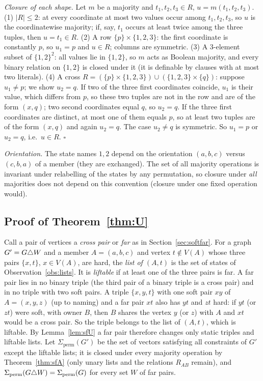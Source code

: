 \emph{Closure of each shape.} Let $m$ be a majority and $t_1,t_2,t_3\in R$, $u=m(t_1,t_2,t_3)$.
(1) $|R|\le2$: at every coordinate at most two values occur among $t_1,t_2,t_3$, so $u$ is the coordinatewise majority; if, say, $t_1$ occurs at least twice among the three tuples, then $u=t_1\in R$.
(2) A row $\{p\}\times\{1,2,3\}$: the first coordinate is constantly $p$, so $u_1=p$ and $u\in R$; columns are symmetric.
(3) A $3$-element subset of $\{1,2\}^2$: all values lie in $\{1,2\}$, so $m$ acts as Boolean majority, and every binary relation on $\{1,2\}$ is closed under it (it is definable by clauses with at most two literals).
(4) A cross $R=(\{p\}\times\{1,2,3\})\cup(\{1,2,3\}\times\{q\})$: suppose $u_1\ne p$; we show $u_2=q$. If two of the three first coordinates coincide, $u_1$ is their value, which differs from $p$, so these two tuples are not in the row and are of the form $(x,q)$; two second coordinates equal $q$, so $u_2=q$. If the three first coordinates are distinct, at most one of them equals $p$, so at least two tuples are of the form $(x,q)$ and again $u_2=q$. The case $u_2\ne q$ is symmetric. So $u_1=p$ or $u_2=q$, i.e.\ $u\in R$. \hfill$\square$

\emph{Orientation.} The state names $1,2$ depend on the orientation $(a,b,c)$ versus $(c,b,a)$ of a member (they are exchanged). The set of all majority operations is invariant under relabelling of the states by any permutation, so closure under \emph{all} majorities does not depend on this convention (closure under one fixed operation would).

\subsection{Proof of Theorem~\ref{thm:U}}\label{app:softU}
Call a pair of vertices a \emph{cross pair} or \emph{far} as in Section~\ref{sec:softfar}. For a graph $G'=G\triangle W$ and a member $A=(a,b,c)$ and vertex $t\notin V(A)$ whose three pairs $\{x,t\}$, $x\in V(A)$, are hard, the \emph{list of $(A,t)$} is the set of states of Observation~\ref{obs:lists}. It is \emph{liftable} if at least one of the three pairs is far. A far pair lies in no binary triple (the third pair of a binary triple is a cross pair) and in no triple with two soft pairs. A triple $\{x,y,t\}$ with one soft pair $xy$ of $A=(x,y,z)$ (up to naming) and a far pair $xt$ also has $yt$ and $zt$ hard: if $yt$ (or $zt$) were soft, with owner $B$, then $B$ shares the vertex $y$ (or $z$) with $A$ and $xt$ would be a cross pair. So the triple belongs to the list of $(A,t)$, which is liftable. By Lemma~\ref{lem:sfU} a far pair therefore changes only static triples and liftable lists. Let $\Sigma_{\mathrm{perm}}(G')$ be the set of vectors satisfying all constraints of $G'$ except the liftable lists; it is closed under every majority operation by Theorem~\ref{thm:sfA} (only unary lists and the relations $R_{AB}$ remain), and $\Sigma_{\mathrm{perm}}(G\triangle W)=\Sigma_{\mathrm{perm}}(G)$ for every set $W$ of far pairs.

